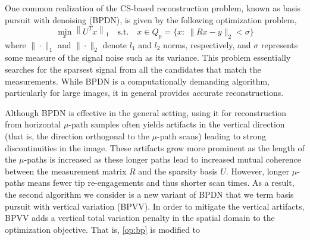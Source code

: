 \documentclass[twocolumn,twoside]{IEEEtran/IEEEtran}
\begin{document}
One common realization of the CS-based reconstruction problem, known as basis
pursuit with denoising (BPDN), is given by the following optimization problem,
\begin{equation}
  \min_{x} \left \| U^Tx \right \|_1 \quad
  \text{s.t.}\quad x\in Q_p = \{x:~\|Rx - y\|_2 < \sigma\} \label{op:bp}
\end{equation}
  where $\| \cdot \|_1$ and $\| \cdot \|_2$ denote $l_1$ and $l_2$ norms,
respectively, and $\sigma$ represents some measure of the signal noise such as
its variance. This problem essentially searches for the sparsest signal from all
the candidates that match the measurements. While BPDN is a computationally
demanding algorithm, particularly for large images, it in general provides
accurate reconstructions.


Although BPDN is effective in the general setting, using it for reconstruction
from horizontal $\mu$-path samples often yields artifacts in the vertical
direction (that is, the direction orthogonal to the $\mu$-path scans) leading to
strong discontinuities in the image. These artifacts grow more prominent as the
length of the $\mu$-paths is increased \cite{maxwell2014compressed} as these
longer paths lead to increased mutual coherence between the measurement matrix
$R$ and the sparsity basis $U$. However, longer $\mu$-paths means fewer
tip re-engagements and thus shorter scan times.
As a result, the second
algorithm we consider is a new variant of BPDN that we term basis pursuit with
vertical variation (BPVV). In order to mitigate the vertical artifacts, BPVV
adds a vertical total variation penalty in the spatial domain to the
optimization objective. That is, \eqref{op:bp} is modified to
\end{document}
